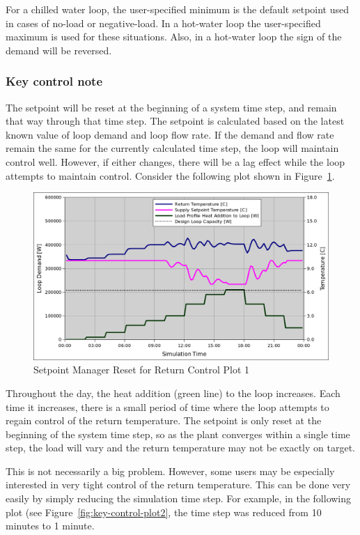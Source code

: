 For a chilled water loop, the user-specified minimum is the default setpoint used in cases of no-load or negative-load. In a hot-water loop the user-specified maximum is used for these situations. Also, in a hot-water loop the sign of the demand will be reversed.

\subsubsection{Key control note}\label{key-control-note}

The setpoint will be reset at the beginning of a system time step, and remain that way through that time step. The setpoint is calculated based on the latest known value of loop demand and loop flow rate. If the demand and flow rate remain the same for the currently calculated time step, the loop will maintain control well. However, if either changes, there will be a lag effect while the loop attempts to maintain control. Consider the following plot shown in Figure~\ref{fig:key-control-plot}.

\begin{figure}[htbp]
\centering
\includegraphics{media/SetPointManager-ResetForReturnControl1.png}
\caption{Setpoint Manager Reset for Return Control Plot 1 \protect \label{fig:key-control-plot}}
\end{figure}

Throughout the day, the heat addition (green line) to the loop increases. Each time it increases, there is a small period of time where the loop attempts to regain control of the return temperature. The setpoint is only reset at the beginning of the system time step, so as the plant converges within a single time step, the load will vary and the return temperature may not be exactly on target.

This is not necessarily a big problem. However, some users may be especially interested in very tight control of the return temperature. This can be done very easily by simply reducing the simulation time step. For example, in the following plot (see Figure~\ref{fig:key-control-plot2}, the time step was reduced from 10 minutes to 1 minute.


